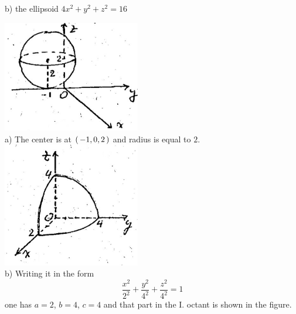 \documentclass[11pt]{amsbook}
\begin{document}

\noindent b) the ellipsoid $4x^2+y^2+z^2=16$

\begin{hSolution}
 \includegraphics[width=0.45\textwidth]{images/b2p1-213-fig01}\\
a) The center is at $ \left( \, -1,0,2 \, \right) $ and radius is equal to $2$. \\
 \includegraphics[width=0.45\textwidth]{images/b2p1-213-fig02}\\
b) Writing it in the form
$$
\frac{x^2}{2^2}+\frac{y^2}{4^2}+\frac{z^2}{4^2}=1
$$
one has $a=2$, $b=4$, $c=4$ and that part in the I. octant is shown in the figure. 

\end{hSolution}
\end{document}
